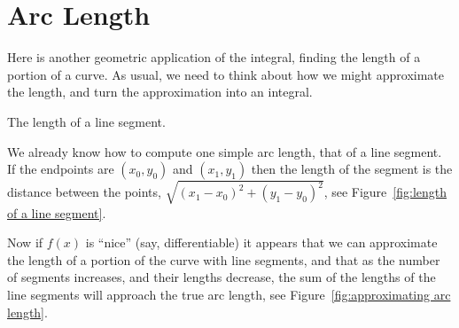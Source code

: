 \section{Arc Length}

Here is another geometric application of the integral, finding the
length of a portion of a curve. As usual, we need to think about how
we might approximate the length, and turn the approximation into an
integral.

\begin{marginfigure}[0in]
\caption{The length of a line segment.}
\label{fig:length of a line segment}
\end{marginfigure}


We already know how to compute one simple arc length, that of a line
segment. If the endpoints are $(x_0,y_0)$ and $(x_1,y_1)$ then the
length of the segment is the distance between the points,
$\sqrt{(x_1-x_0)^2+(y_1-y_0)^2}$, see Figure~\ref{fig:length of a line segment}.

Now if $f(x)$ is ``nice'' (say, differentiable) it appears that we can
approximate the length of a portion of the curve with line segments,
and that as the number of segments increases, and their lengths
decrease, the sum of the lengths of the line segments will approach
the true arc length, see Figure~\ref{fig:approximating arc length}.

